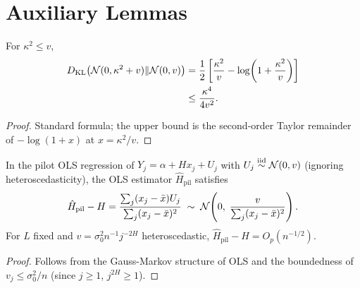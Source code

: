 \section{Auxiliary Lemmas}
\label{app:lemmas}

\begin{lemma}
\label{lem:kl-gaussian}
For $\kappa^2 \leq v$,
\begin{align*}
    D_{\mathrm{KL}}\bigl(\mathcal{N}(0, \kappa^2+v)\|\mathcal{N}(0,v)\bigr)
    &= \frac{1}{2}\left[\frac{\kappa^2}{v} - \log\!\left(1 + \frac{\kappa^2}{v}\right)\right] \\
    &\leq \frac{\kappa^4}{4v^2}.
\end{align*}
\end{lemma}

\begin{proof}
Standard formula; the upper bound is the second-order Taylor remainder of
$-\log(1+x)$ at $x = \kappa^2/v$.
\end{proof}

\begin{lemma}
\label{lem:ols-rate}
In the pilot OLS regression of $Y_j = \alpha + H x_j + U_j$ with
$U_j \overset{\text{iid}}{\sim} \mathcal{N}(0, v)$ (ignoring heteroscedasticity), the OLS estimator
$\hat H_{\mathrm{pil}}$ satisfies
\[
    \hat H_{\mathrm{pil}} - H = \frac{\sum_j (x_j - \bar x) U_j}
    {\sum_j (x_j - \bar x)^2}
    \;\sim\;
    \mathcal{N}\!\left(0,\; \frac{v}{\sum_j (x_j-\bar x)^2}\right).
\]
For $L$ fixed and $v = \sigma_0^2 n^{-1} j^{-2H}$ heteroscedastic,
$\hat H_{\mathrm{pil}} - H = O_p(n^{-1/2})$.
\end{lemma}

\begin{proof}
Follows from the Gauss-Markov structure of OLS and the boundedness of
$v_j \leq \sigma_0^2/n$ (since $j \geq 1$, $j^{2H} \geq 1$).
\end{proof}

